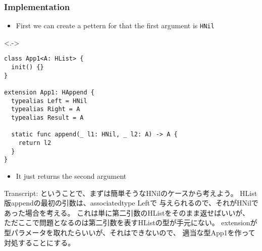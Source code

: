 \begin{frame}[fragile]
  \frametitle{Implementation}

  \begin{itemize}
    \item<+-> First we can create a pettern for that the
    first argument is \lstinline|HNil|
  \end{itemize}

  \begin{uncoverenv}<.->
\begin{lstlisting}[style=swift]
class App1<A: HList> {
  init() {}
}

extension App1: HAppend {
  typealias Left = HNil
  typealias Right = A
  typealias Result = A
   
  static func append(_ l1: HNil, _ l2: A) -> A {
    return l2
  }
}
\end{lstlisting}
  \end{uncoverenv}

  \begin{itemize}
    \item<+-> It just returns the second argument
  \end{itemize}

  \begin{notes}
    \item Transcript:
    ということで、まずは簡単そうなHNilのケースから考えよう。
    HList版appendの最初の引数は、associatedtype Leftで
    与えられるので、それがHNilであった場合を考える。
    これは単に第二引数のHListをそのまま返せばいいが、
    ただここで問題となるのは第二引数を表すHListの型が手元にない。
    extensionが型パラメータを取れたらいいが、それはできないので、
    適当な型App1を作って対処することにする。
  \end{notes}
\end{frame}

